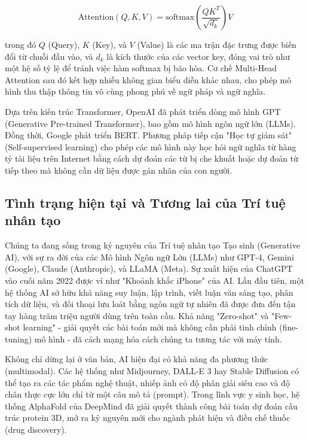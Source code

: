 \documentclass[12pt,a4paper]{article}
\begin{document}
\begin{equation}
\text{Attention}(Q, K, V) = \text{softmax}\left(\frac{QK^T}{\sqrt{d_k}}\right)V
\end{equation}

trong đó $Q$ (Query), $K$ (Key), và $V$ (Value) là các ma trận đặc trưng được biến đổi từ chuỗi đầu vào, và $d_k$ là kích thước của các vector key, đóng vai trò như một hệ số tỷ lệ để tránh việc hàm softmax bị bão hòa. Cơ chế Multi-Head Attention sau đó kết hợp nhiều không gian biểu diễn khác nhau, cho phép mô hình thu thập thông tin vô cùng phong phú về ngữ pháp và ngữ nghĩa.

Dựa trên kiến trúc Transformer, OpenAI đã phát triển dòng mô hình GPT (Generative Pre-trained Transformer), bao gồm mô hình ngôn ngữ lớn (LLMs). Đồng thời, Google phát triển BERT. Phương pháp tiếp cận "Học tự giám sát" (Self-supervised learning) cho phép các mô hình này học hỏi ngữ nghĩa từ hàng tỷ tài liệu trên Internet bằng cách dự đoán các từ bị che khuất hoặc dự đoán từ tiếp theo mà không cần dữ liệu được gán nhãn của con người.

\newpage

\subsection{Tình trạng hiện tại và Tương lai của Trí tuệ nhân tạo}

Chúng ta đang sống trong kỷ nguyên của Trí tuệ nhân tạo Tạo sinh (Generative AI), với sự ra đời của các Mô hình Ngôn ngữ Lớn (LLMs) như GPT-4, Gemini (Google), Claude (Anthropic), và LLaMA (Meta). Sự xuất hiện của ChatGPT vào cuối năm 2022 được ví như "Khoảnh khắc iPhone" của AI. Lần đầu tiên, một hệ thống AI sở hữu khả năng suy luận, lập trình, viết luận văn sáng tạo, phân tích dữ liệu, và đối thoại lưu loát bằng ngôn ngữ tự nhiên đã được đưa đến tận tay hàng trăm triệu người dùng trên toàn cầu. Khả năng "Zero-shot" và "Few-shot learning" - giải quyết các bài toán mới mà không cần phải tinh chỉnh (fine-tuning) mô hình - đã cách mạng hóa cách chúng ta tương tác với máy tính.

Không chỉ dừng lại ở văn bản, AI hiện đại có khả năng đa phương thức (multimodal). Các hệ thống như Midjourney, DALL-E 3 hay Stable Diffusion có thể tạo ra các tác phẩm nghệ thuật, nhiếp ảnh có độ phân giải siêu cao và độ chân thực cực lớn chỉ từ một câu mô tả (prompt). Trong lĩnh vực y sinh học, hệ thống AlphaFold của DeepMind đã giải quyết thành công bài toán dự đoán cấu trúc protein 3D, mở ra kỷ nguyên mới cho ngành phát hiện và điều chế thuốc (drug discovery).
\end{document}
